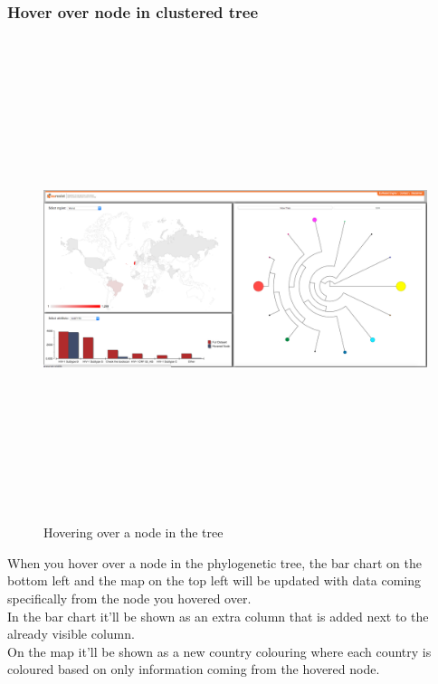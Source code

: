 \documentclass[a4paper, 11pt]{article} %
\begin{document}
\subsubsection{Hover over node in clustered tree}
\begin{figure}[H]
\centering
\includegraphics[width=400pt, height=400pt, keepaspectratio=true]{images/hover_node.PNG}
\caption{Hovering over a node in the tree}
\label{fig:hover_node}
\end{figure}

When you hover over a node in the phylogenetic tree, the bar chart on the bottom left and the map on the top left will be updated with data coming specifically from the node you hovered over.
\\
In the bar chart it'll be shown as an extra column that is added next to the already visible column.
\\
On the map it'll be shown as a new country colouring where each country is coloured based on only information coming from the hovered node.
\end{document}
